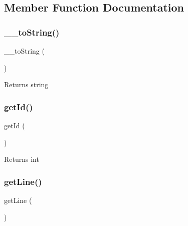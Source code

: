 \subsection{Member Function Documentation}
\mbox{\label{class_p_h_p___token_a7516ca30af0db3cdbf9a7739b48ce91d}} 
\subsubsection{\texorpdfstring{\+\_\+\+\_\+to\+String()}{\_\_toString()}}
{\footnotesize\ttfamily \+\_\+\+\_\+to\+String (\begin{DoxyParamCaption}{ }\end{DoxyParamCaption})}

\begin{DoxyReturn}{Returns}
string 
\end{DoxyReturn}
\mbox{\label{class_p_h_p___token_a12251d0c022e9e21c137a105ff683f13}} 
\subsubsection{\texorpdfstring{get\+Id()}{getId()}}
{\footnotesize\ttfamily get\+Id (\begin{DoxyParamCaption}{ }\end{DoxyParamCaption})}

\begin{DoxyReturn}{Returns}
int 
\end{DoxyReturn}
\mbox{\label{class_p_h_p___token_aef9c32f6066788a101028a1d4150f8cb}} 
\subsubsection{\texorpdfstring{get\+Line()}{getLine()}}
{\footnotesize\ttfamily get\+Line (\begin{DoxyParamCaption}{ }\end{DoxyParamCaption})}


